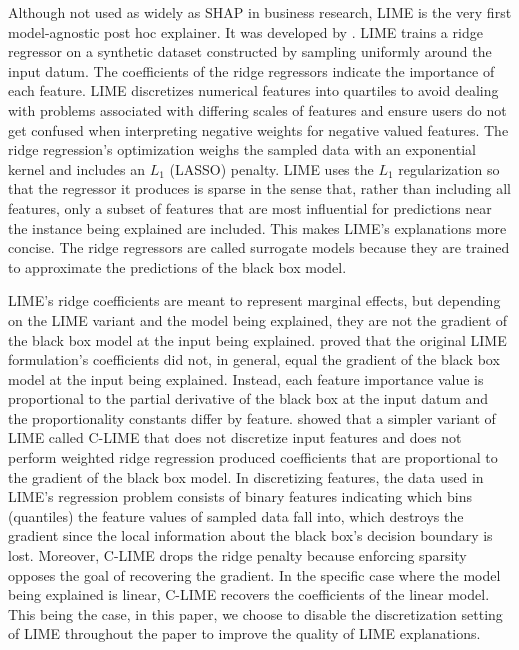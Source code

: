 \documentclass[12pt]{article}  %
\begin{document}
    
Although not used as widely as SHAP in business research, LIME is the very first model-agnostic post hoc explainer. It was developed by \citet{ribeiro16lime}. LIME trains a ridge regressor on a synthetic dataset constructed by sampling uniformly around the input datum. The coefficients of the ridge regressors indicate the importance of each feature. LIME discretizes numerical features into quartiles to avoid dealing with problems associated with differing scales of features and ensure users do not get confused when interpreting negative weights for negative valued features. The ridge regression's optimization weighs the sampled data with an exponential kernel and includes an $L_1$ (LASSO) penalty. LIME uses the $L_1$ regularization so that the regressor it produces is sparse in the sense that, rather than including all features, only a subset of features that are most influential for predictions near the instance being explained are included. This makes LIME's explanations more concise. The ridge regressors are called surrogate models because they are trained to approximate the predictions of the black box model.
    
    LIME's ridge coefficients are meant to represent marginal effects, but depending on the LIME variant and the model being explained, they are not the gradient of the black box model at the input being explained. \citet{garreau2020looking} proved that the original LIME formulation's coefficients did not, in general, equal the gradient of the black box model at the input being explained. Instead, each feature importance value is proportional to the partial derivative of the black box at the input datum and the proportionality constants differ by feature. \citet{agarwal21clime} showed that a simpler variant of LIME called C-LIME that does not discretize input features and does not perform weighted ridge regression produced coefficients that are proportional to the gradient of the black box model. %
    In discretizing features, the data used in LIME's regression problem consists of binary features indicating which bins (quantiles) the feature values of sampled data fall into, which destroys the gradient since the local information about the black box's decision boundary is lost. Moreover, C-LIME drops the ridge penalty because enforcing sparsity opposes the goal of recovering the gradient. In the specific case where the model being explained is linear, C-LIME recovers the coefficients of the linear model. This being the case, in this paper, we choose to disable the discretization setting of LIME throughout the paper to improve the quality of LIME explanations.
\end{document}
